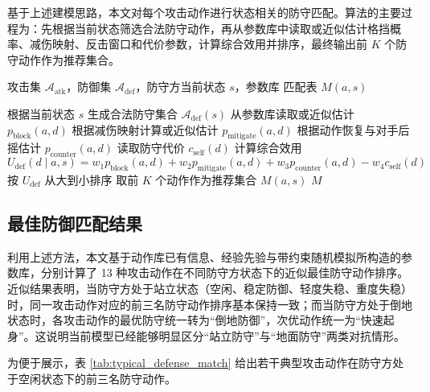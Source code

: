 基于上述建模思路，本文对每个攻击动作进行状态相关的防守匹配。算法的主要过程为：先根据当前状态筛选合法防守动作，再从参数库中读取或近似估计格挡概率、减伤映射、反击窗口和代价参数，计算综合效用并排序，最终输出前 \(K\) 个防守动作作为推荐集合。

\begin{algorithm}[H]
\caption{最佳防御匹配算法}
\label{alg:defense_match}
\begin{algorithmic}[1]
\Require 攻击集 \(\mathcal{A}_{\text{atk}}\)，防御集 \(\mathcal{A}_{\text{def}}\)，防守方当前状态 \(s\)，参数库
\Ensure 匹配表 \(M(a,s)\)

    \State 根据当前状态 \(s\) 生成合法防守集合 \(\mathcal{A}_{\text{def}}(s)\)
        \State 从参数库读取或近似估计 \(p_{\text{block}}(a,d)\)
        \State 根据减伤映射计算或近似估计 \(p_{\text{mitigate}}(a,d)\)
        \State 根据动作恢复与对手后摇估计 \(p_{\text{counter}}(a,d)\)
        \State 读取防守代价 \(c_{\text{self}}(d)\)
        \State 计算综合效用
        \[
        U_{\text{def}}(d\mid a,s)
        =
        w_1 p_{\text{block}}(a,d)
        +w_2 p_{\text{mitigate}}(a,d)
        +w_3 p_{\text{counter}}(a,d)
        -w_4 c_{\text{self}}(d)
        \]
    \EndFor
    \State 按 \(U_{\text{def}}\) 从大到小排序
    \State 取前 \(K\) 个动作作为推荐集合 \(M(a,s)\)
\EndFor
\State \Return \(M\)
\end{algorithmic}
\end{algorithm}

\subsection{最佳防御匹配结果}

利用上述方法，本文基于动作库已有信息、经验先验与带约束随机模拟所构造的参数库，分别计算了 13 种攻击动作在不同防守方状态下的近似最佳防守动作排序。近似结果表明，当防守方处于站立状态（空闲、稳定防御、轻度失稳、重度失稳）时，同一攻击动作对应的前三名防守动作排序基本保持一致；而当防守方处于倒地状态时，各攻击动作的最优防守统一转为“倒地防御”，次优动作统一为“快速起身”。这说明当前模型已经能够明显区分“站立防守”与“地面防守”两类对抗情形。

为便于展示，表 \ref{tab:typical_defense_match} 给出若干典型攻击动作在防守方处于空闲状态下的前三名防守动作。

\immediate{}


